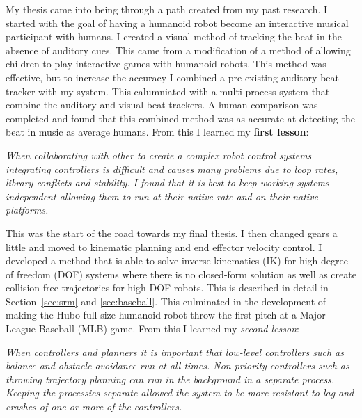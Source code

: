 My thesis came into being through a path created from my past research.
I started with the goal of having a humanoid robot become an interactive musical participant with humans.
I created a visual method of tracking the beat in the absence of auditory cues\cite{5686847}.
This came from a modification of a method of allowing children to play interactive games with humanoid robots\cite{lofaroGamesRobot}.
This method was effective, but to increase the accuracy I combined a pre-existing auditory beat tracker with my system.
This calumniated with a multi process system that combine the auditory and visual beat trackers\cite{lofaroIASTED2011,6094987,lofaroEURASIP2011}.
A human comparison was completed and found that this combined method was as accurate at detecting the beat in music as average humans.
From this I learned my \textbf{first lesson}:
\begin{adjustwidth}{2cm}{} \small
\noindent \textit{When collaborating with other to create a complex robot control systems integrating controllers is difficult and causes many problems due to loop rates, library conflicts and stability.
I found that it is best to keep working systems independent allowing them to run at their native rate and on their native platforms.}
\end{adjustwidth} \normalsize
\noindent This was the start of the road towards my final thesis.
I then changed gears a little and moved to kinematic planning and end effector velocity control. 
I developed a method that is able to solve inverse kinematics (IK) for high degree of freedom (DOF) systems where there is no closed-form solution as well as create collision free trajectories for high DOF robots\cite{6385987}.
This is described in detail in Section~\ref{sec:srm} and \ref{sec:baseball}.
This culminated in the development of making the Hubo full-size humanoid robot throw the first pitch at a Major League Baseball (MLB) game\cite{lofaroHumanoids2012,6462956}.
From this I learned my \textit{second lesson}:
\begin{adjustwidth}{2cm}{} \small
\noindent \textit{When controllers and planners it is important that low-level controllers such as balance and obstacle avoidance run at all times. 
Non-priority controllers such as throwing trajectory planning can run in the background in a separate process.
Keeping the processies separate allowed the system to be more resistant to lag and crashes of one or more of the controllers. }
\end{adjustwidth} \normalsize
